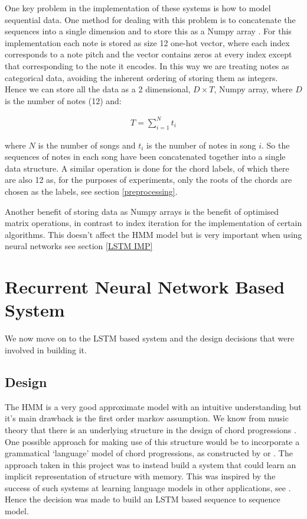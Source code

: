 \documentclass[bsc,singlespacing,logo, parskip, deptreport]{infthesis}
\begin{document}
One key problem in the implementation of these systems is how to model sequential data. One method for dealing with this problem is to concatenate the sequences into a single dimension and to store this as a Numpy array \cite{numpy_2005}. For this implementation each note is stored as size 12 one-hot vector, where each index corresponds to a note pitch and the vector contains zeros at every index except that corresponding to the note it encodes. In this way we are treating notes as categorical data, avoiding the inherent ordering of storing them as integers. Hence we can store all the data as a 2 dimensional, $D \times T$, Numpy array, where $D$ is the number of notes (12) and:

\begin{align}
  T = \sum_{i=1}^{N} t_i
\end{align}

where $N$ is the number of songs and $t_i$ is the number of notes in song $i$. So the sequences of notes in each song have been concatenated together into a single data structure. A similar operation is done for the chord labels, of which there are also 12 as, for the purposes of experiments, only the roots of the chords are chosen as the labels, see section \ref{preprocessing}.

Another benefit of storing data as Numpy arrays is the benefit of optimised matrix operations, in contrast to index iteration for the implementation of certain algorithms. This doesn't affect the HMM model but is very important when using neural networks see section \ref{LSTM IMP}

\section{Recurrent Neural Network Based System} \label{LSTM}
We now move on to the LSTM based system and the design decisions that were involved in building it. 

\subsection{Design}
The HMM is a very good approximate model with an intuitive understanding but it's main drawback is the first order markov assumption. We know from music theory that there is an underlying structure in the design of chord progressions \cite{krumhansl1982perceived} \cite{piston1948harmony}. One possible approach for making use of this structure would be to incorporate a grammatical `language' model of chord progressions, as constructed by \cite{granroth2014robust} or \cite{rohrmeier2007generative}. The approach taken in this project was to instead build a system that could learn an implicit representation of structure with memory. This was inspired by the success of such systems at learning language models in other applications, see \cite{schmidhuber2002learning} \cite{sundermeyer2012lstm}. Hence the decision was made to build an LSTM based sequence to sequence model.
\end{document}
